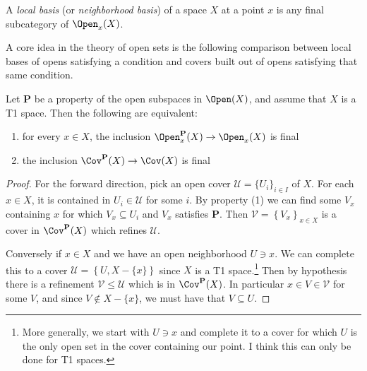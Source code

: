 \documentclass[11pt]{book}
\begin{document}
\begin{terminology} A \emph{local basis} (or \emph{neighborhood basis}) of a space $X$ at a point $x$ is any final subcategory of $\Open_x(X)$.
\end{terminology}

A core idea in the theory of open sets is the following comparison between local bases of opens satisfying a condition and covers built out of opens satisfying that same condition.

\begin{proposition}\label{prop:local-properties-cover-properties} 
Let $\mathbf{P}$ be a property of the open subspaces in $\Open(X)$, and assume that $X$ is a T1 space. Then the following are equivalent:
\begin{enumerate}
    \item for every $x\in X$, the inclusion $\Open_x^{\mathbf{P}}(X) \to \Open_x(X)$ is final %
    \item the inclusion $\Cov^{\mathbf{P}}(X) \to \Cov(X)$ is final %
\end{enumerate}
\end{proposition}
\begin{proof} For the forward direction, pick an open cover $\mathcal{U} = \{U_i\}_{i\in I}$ of $X$. For each $x\in X$, it is contained in $U_i\in \mathcal{U}$ for some $i$. By property (1) we can find some $V_x$ containing $x$ for which $V_x \subseteq U_i$ and $V_x$ satisfies $\mathbf{P}$. Then $\mathcal{V} = \left\{ V_x \right\}_{x\in X}$ is a cover in $\Cov^{\mathbf{P}}(X)$ which refines $\mathcal{U}$.

Conversely if $x\in X$ and we have an open neighborhood $U\ni x$. We can complete this to a cover $\mathcal{U} = \left\{ U, X-\{x\} \right\}$ since $X$ is a T1 space.\footnote{More generally, we start with $U\ni x$ and complete it to a cover for which $U$ is the only open set in the cover containing our point. I think this can only be done for T1 spaces.} Then by hypothesis there is a refinement $\mathcal{V} \le \mathcal{U}$ which is in $\Cov^{\mathbf{P}}(X)$. In particular $x\in V \in \mathcal{V}$ for some $V$, and since $V \notin X\minus\{x\}$, we must have that $V \subseteq U$.
\end{proof}
\end{document}
